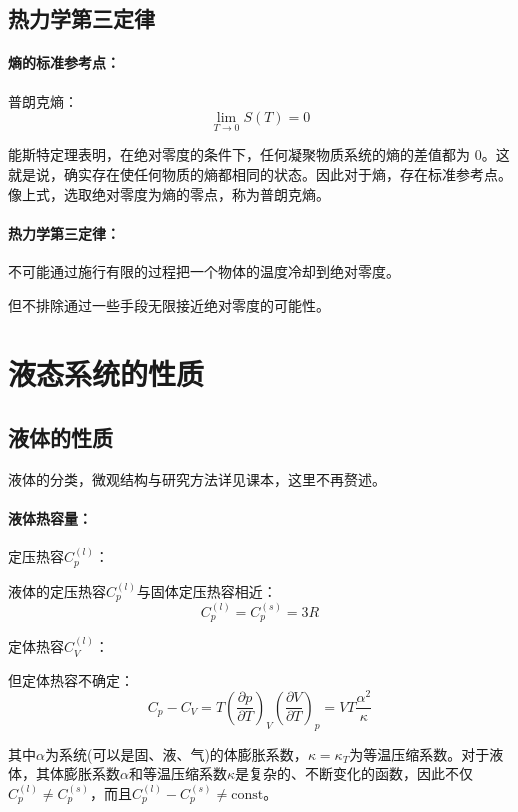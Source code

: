 \documentclass[zihao=-4,UTF8]{report}
\begin{document}
\section{热力学第三定律}
\subsubsection{熵的标准参考点：}
普朗克熵：
\begin{equation}
    \lim_{T\rightarrow 0} S(T) = 0
\end{equation}
{\par\color{gray}\small
能斯特定理表明，在绝对零度的条件下，任何凝聚物质系统的熵的差值都为 0。这就是说，确实存在使任何物质的熵都相同的状态。因此对于熵，存在标准参考点。像上式，选取绝对零度为熵的零点，称为普朗克熵。
\par}
\subsubsection{热力学第三定律：}
不可能通过施行有限的过程把一个物体的温度冷却到绝对零度。
{\par\color{gray}\small
但不排除通过一些手段无限接近绝对零度的可能性。
\par}

\chapter{液态系统的性质}
\section{液体的性质}
液体的分类，微观结构与研究方法详见课本，这里不再赘述。
\subsubsection{液体热容量：}
定压热容$C_p^{(l)}$：\par
液体的定压热容$C_p^{(l)}$与固体定压热容相近：
\begin{equation}
    C_p^{(l)} = C_p^{(s)} = 3R 
\end{equation}
\par{}定体热容$C_V^{(l)}$：\par
但定体热容不确定：
\begin{equation}\label{液体定体热容}
    C_p - C_V = T\left(\frac{\partial p}{\partial T}\right)_V\left(\frac{\partial V}{\partial T}\right)_p = VT\frac{\alpha^2}{\kappa}
\end{equation}
{\par\color{gray}\small
其中$\alpha$为系统(可以是固、液、气)的体膨胀系数，$\kappa = \kappa_T$为等温压缩系数。对于液体，其体膨胀系数$\alpha$和等温压缩系数$\kappa$是复杂的、不断变化的函数，因此不仅$C_p^{(l)} \ne C_p^{(s)} $，而且$C_p^{(l)} - C_p^{(s)} \ne \text{const}$。
\par}
\end{document}
